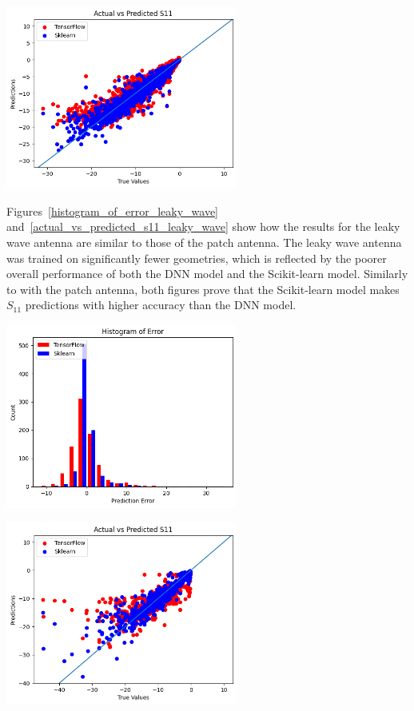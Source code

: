 \documentclass[lettersize,journal]{IEEEtran}
\newenvironment{Figure}
    {\par\medskip\noindent\minipage{\linewidth}}
    {\endminipage\par\medskip}
\begin{document}
\begin{Figure}
    \centering
    \includegraphics[width=3in]{actual_vs_predicted_s11_patch}
    \label{actual_vs_predicted_s11_patch}
\end{Figure}

Figures~\ref{histogram_of_error_leaky_wave} and~\ref{actual_vs_predicted_s11_leaky_wave} show how the results for the leaky wave antenna are similar to those of the patch antenna. The leaky wave antenna was trained on significantly fewer geometries, which is reflected by the poorer overall performance of both the DNN model and the Scikit-learn model. Similarly to with the patch antenna, both figures prove that the Scikit-learn model makes $S_{11}$ predictions with higher accuracy than the DNN model.

\begin{Figure}
    \centering
    \includegraphics[width=3in]{histogram_leaky_wave}
    \label{histogram_of_error_leaky_wave}
\end{Figure}

\begin{Figure}
    \centering
    \includegraphics[width=3in]{actual_vs_predicted_s11_leaky_wave}
    \label{actual_vs_predicted_s11_leaky_wave}
\end{Figure}
\end{document}
